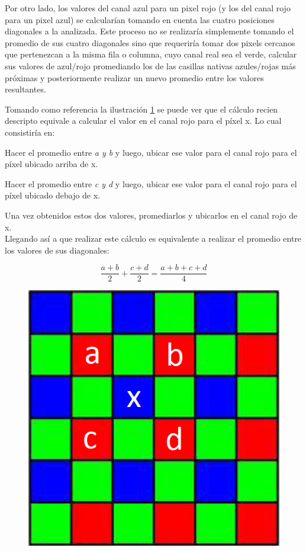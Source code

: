 \documentclass[a4paper]{article}
\begin{document}
Por otro lado, los valores del canal azul para un pixel rojo (y los del canal rojo para un pixel azul) se calcularían tomando en cuenta las cuatro posiciones diagonales a la analizada. Este proceso no se realizar\'ia simplemente tomando el promedio de sus cuatro diagonales sino que requeriría tomar dos pixels cercanos que pertenezcan a la misma fila o columna, cuyo canal real sea el verde, calcular sus valores de azul/rojo promediando los de las casillas nativas azules/rojas más próximas y posteriormente realizar un nuevo promedio entre los valores resultantes.

Tomando como referencia la ilustración \ref{bilineal} se puede ver que el cálculo recien descripto equivale a calcular el valor en el canal rojo para el p\'ixel x. Lo cual consistir\'ia en: 

Hacer el promedio entre \textit{a y b} y luego, ubicar ese valor para el canal rojo para el p\'ixel ubicado arriba de x.

Hacer el promedio entre \textit{c y d} y luego, ubicar ese valor para el canal rojo para el p\'ixel ubicado debajo de x.

Una vez obtenidos estos dos valores, promediarlos y ubicarlos en el canal rojo de x.\\

Llegando as\'i a que realizar este c\'alculo es equivalente a realizar el promedio entre los valores de sus diagonales:

\[
 \frac{a+b}{2} + \frac{c+d}{2} = \frac{a+b+c+d}{4}
\]

\begin{figure}[h!]
	\caption{}
	\begin{center}
	\includegraphics[scale=0.36]{imagenes/bilineal}
	\label{bilineal}
  \end{center}
\end{figure}
\end{document}
